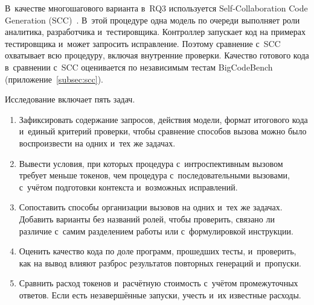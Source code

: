 В~качестве многошагового варианта в~RQ3 используется Self-Collaboration Code Generation (SCC)~\cite{dong2023selfcollaboration}. В~этой процедуре одна модель по очереди выполняет роли аналитика, разработчика и~тестировщика. Контроллер запускает код на примерах тестировщика и~может запросить исправление. Поэтому сравнение с~SCC охватывает всю процедуру, включая внутренние проверки. Качество готового кода в~сравнении с~SCC оценивается по независимым тестам BigCodeBench (приложение~\ref{subsec:scc}).

Исследование включает пять задач.
\begin{enumerate}
\item Зафиксировать содержание запросов, действия модели, формат итогового кода и~единый критерий проверки, чтобы сравнение способов вызова можно было воспроизвести на одних и~тех же задачах.
\item Вывести условия, при которых процедура с~интроспективным вызовом требует меньше токенов, чем процедура с~последовательными вызовами, с~учётом подготовки контекста и~возможных исправлений.
\item Сопоставить способы организации вызовов на одних и~тех же задачах. Добавить варианты без названий ролей, чтобы проверить, связано ли различие с~самим разделением работы или с~формулировкой инструкции.
\item Оценить качество кода по доле программ, прошедших тесты, и~проверить, как на вывод влияют разброс результатов повторных генераций и~пропуски.
\item Сравнить расход токенов и~расчётную стоимость с~учётом промежуточных ответов. Если есть незавершённые запуски, учесть и~их известные расходы.
\end{enumerate}


